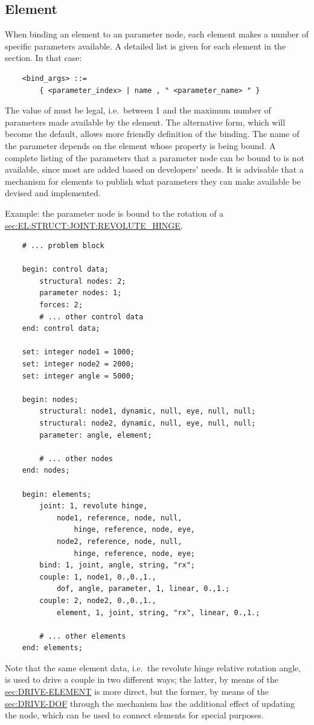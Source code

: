 \subsection{Element}
When binding an element to an 
 parameter node,
each element makes a number of specific parameters available.
A detailed list is given for each element in the 
section.
In that case:
\begin{verbatim}
    <bind_args> ::=
        { <parameter_index> | name , " <parameter_name> " }
\end{verbatim}
The value of  must be legal, i.e.\ between 1 and the
maximum number of parameters made available by the element.
The alternative form, which will become the default, allows more
friendly definition of the binding.
The name of the parameter depends on the element whose property
is being bound.
A complete listing of the parameters that a parameter node 
can be bound to is not available, since most are added based
on developers' needs.
It is advisable that a mechanism for elements to publish 
what parameters they can make available be devised and implemented.

Example: the parameter node  is bound to the rotation of a 
\hyperref{\kw{revolute hinge}}{\kw{revolute hinge} (see Section~}{)}{sec:EL:STRUCT:JOINT:REVOLUTE_HINGE}.
\begin{verbatim}
    # ... problem block

    begin: control data;
        structural nodes: 2;
        parameter nodes: 1;
        forces: 2;
        # ... other control data
    end: control data;

    set: integer node1 = 1000;
    set: integer node2 = 2000;
    set: integer angle = 5000;

    begin: nodes;
        structural: node1, dynamic, null, eye, null, null;
        structural: node2, dynamic, null, eye, null, null;
        parameter: angle, element;

        # ... other nodes
    end: nodes;

    begin: elements;
        joint: 1, revolute hinge,
            node1, reference, node, null,
                hinge, reference, node, eye,
            node2, reference, node, null,
                hinge, reference, node, eye;
        bind: 1, joint, angle, string, "rx";
        couple: 1, node1, 0.,0.,1.,
            dof, angle, parameter, 1, linear, 0.,1.;
        couple: 2, node2, 0.,0.,1.,
            element, 1, joint, string, "rx", linear, 0.,1.;

        # ... other elements
    end: elements;
\end{verbatim}
Note that the same element data, i.e.\ the revolute hinge
relative rotation angle, is used to drive a couple in two different
ways; the latter, by means of the 
\hyperref{\kw{element} drive}{\kw{element} drive (see Section~}{)}{sec:DRIVE-ELEMENT}
is more direct, but the former, by means of the 
\hyperref{\kw{dof} drive}{\kw{dof} drive (see Section~}{)}{sec:DRIVE-DOF}
through the  mechanism has the additional effect of updating
the  node, which can be used to connect
 elements for special purposes.

